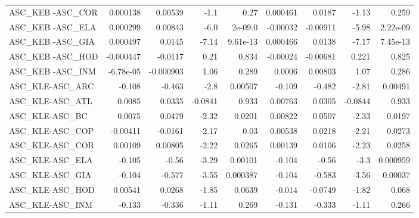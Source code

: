 \begin{tabular}{lrrrrrrrr}
ASC\_KEB -ASC\_COR                       &    0.000138 &      0.00539 &    -1.1 &     0.27 &   0.000461 &      0.0187 &        -1.13 &         0.259 \\
ASC\_KEB -ASC\_ELA                       &    0.000299 &      0.00843 &    -6.0 &  2e-09.0 &   -0.00032 &    -0.00911 &        -5.98 &      2.22e-09 \\
ASC\_KEB -ASC\_GIA                       &    0.000497 &       0.0145 &   -7.14 & 9.61e-13 &   0.000466 &      0.0138 &        -7.17 &      7.45e-13 \\
ASC\_KEB -ASC\_HOD                       &   -0.000447 &      -0.0117 &    0.21 &    0.834 &   -0.00024 &    -0.00681 &        0.221 &         0.825 \\
ASC\_KEB -ASC\_INM                       &   -6.78e-05 &    -0.000903 &    1.06 &    0.289 &     0.0006 &     0.00803 &         1.07 &         0.286 \\
ASC\_KLE-ASC\_ARC                        &      -0.108 &       -0.463 &    -2.8 &  0.00507 &     -0.109 &      -0.482 &        -2.81 &       0.00491 \\
ASC\_KLE-ASC\_ATL                        &      0.0085 &       0.0335 & -0.0841 &    0.933 &    0.00763 &      0.0305 &      -0.0844 &         0.933 \\
ASC\_KLE-ASC\_BC                         &      0.0075 &       0.0479 &   -2.32 &   0.0201 &    0.00822 &      0.0507 &        -2.33 &        0.0197 \\
ASC\_KLE-ASC\_COP                        &    -0.00411 &      -0.0161 &   -2.17 &     0.03 &    0.00538 &      0.0218 &        -2.21 &        0.0273 \\
ASC\_KLE-ASC\_COR                        &     0.00109 &      0.00805 &   -2.22 &   0.0265 &    0.00139 &      0.0106 &        -2.23 &        0.0258 \\
ASC\_KLE-ASC\_ELA                        &      -0.105 &        -0.56 &   -3.29 &  0.00101 &     -0.104 &       -0.56 &         -3.3 &      0.000959 \\
ASC\_KLE-ASC\_GIA                        &      -0.104 &       -0.577 &   -3.55 & 0.000387 &     -0.104 &      -0.583 &        -3.56 &       0.00037 \\
ASC\_KLE-ASC\_HOD                        &     0.00541 &       0.0268 &   -1.85 &   0.0639 &     -0.014 &     -0.0749 &        -1.82 &         0.068 \\
ASC\_KLE-ASC\_INM                        &      -0.133 &       -0.336 &   -1.11 &    0.269 &     -0.131 &      -0.333 &        -1.11 &         0.266 \\

\end{tabular}
